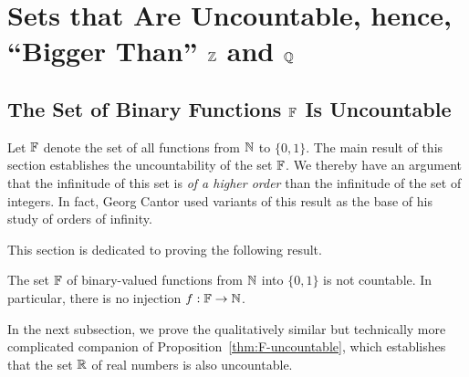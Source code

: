 \section{Sets that Are Uncountable, hence, ``Bigger Than'' $\mathbb{Z}$ and $\mathbb{Q}$}
\label{sec:Q-Z-F-cardinality}
\label{sec:FNS-uncountable}

\subsection{The Set of Binary Functions $\mathbb{F}$ Is Uncountable}
\label{sec:F-uncountable}


Let $\mathbb{F}$ denote the set of all functions from $\mathbb{N}$ to $\{0,1\}$.  The main result of this section establishes the uncountability of the set $\mathbb{F}$.  We thereby have an argument that the infinitude of this set is {\em of a higher order} than the infinitude of the set of integers.  In fact, Georg Cantor used variants of this result as the base of his study of orders of infinity.

\medskip

This section is dedicated to proving the following result.

\begin{prop}
\label{thm:F-uncountable}
The set $\mathbb{F}$ of binary-valued functions from $\mathbb{N}$ into $\{0,1\}$ is not countable.  In particular, there is no injection $f: \mathbb{F} \rightarrow \mathbb{N}$.
\end{prop}

In the next subsection, we prove the qualitatively similar but technically more complicated companion of Proposition~\ref{thm:F-uncountable}, which establishes that the set $\mathbb{R}$ of real numbers is also uncountable.

 

